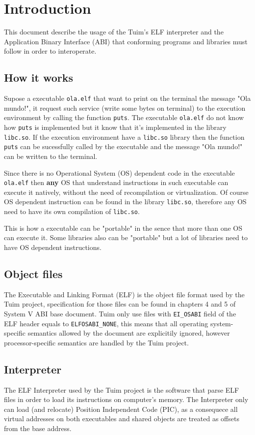\chapter{Introduction}

This document describe the usage of the Tuim's ELF interpreter
and the Application Binary Interface (ABI) that conforming programs and libraries
must follow in order to interoperate.

\section{How it works}

Supose a executable \texttt{ola.elf} that want to print on the terminal
the message
"Ola mundo!", it request such service (write some bytes on terminal)
to the execution environment by calling the function \texttt{puts}.
The executable \texttt{ola.elf} do not know how \texttt{puts} is implemented but
it know that it's implemented in the library \texttt{libc.so}.
If the execution environment have a \texttt{libc.so} library then the function
\texttt{puts} can be sucessfully called by the executable and the message
"Ola mundo!" can be written to the terminal.

Since there is no Operational System (OS) dependent code in the executable
\texttt{ola.elf} then \textbf{any} OS that understand instructions in such executable
can execute it natively, without the need of recompilation or virtualization.
Of course OS dependent instruction can be found in the library \texttt{libc.so},
therefore any OS need to have its own compilation of \texttt{libc.so}.

This is how a executable can be "portable" in the sence that more than one
OS can execute it. Some libraries also can be "portable" but a lot of libraries
need to have OS dependent instructions.

\section{Object files}

The Executable and Linking Format (ELF) is the object file format used
by the Tuim project, specification for those files can be found in
chapters 4 and 5 of System V ABI\cite{sysv} base document.
Tuim only use files with \texttt{EI\_OSABI} field of the ELF header equals
to \texttt{ELFOSABI\_NONE},
this means that all operating system-specific semantics
allowed by the document are explicitily ignored,
however processor-specific semantics are handled by the Tuim project.

\section{Interpreter}

The ELF Interpreter used by the Tuim project is the software that
parse ELF files in order to load its instructions on computer's memory.
The Interpreter only can load (and relocate) Position Independent Code (PIC),
as a consequece all virtual addresses on both executables and shared objects
are treated as offsets from the base address.
